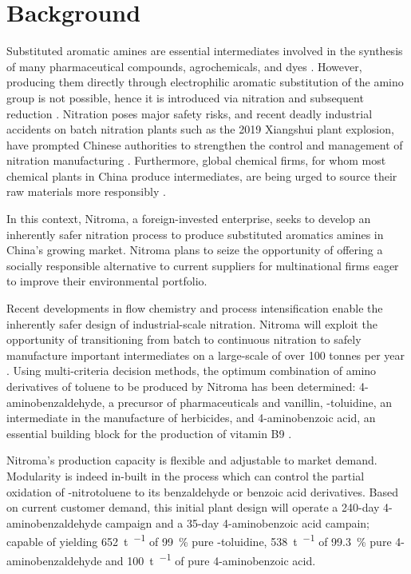 \section*{Background}

Substituted aromatic amines are essential intermediates involved in the synthesis of many pharmaceutical compounds, agrochemicals, and dyes \cite{vogt_amines_2000}. However, producing them directly through electrophilic aromatic substitution of the amino group is not possible, hence it is introduced via nitration and subsequent reduction \cite{dugal_nitrobenzene_2005}. Nitration poses major safety risks, and recent deadly industrial accidents on batch nitration plants such as the 2019 Xiangshui plant explosion, have prompted Chinese authorities to strengthen the control and management of nitration manufacturing \cite{el_diario_china_2019}. Furthermore, global chemical firms, for whom most chemical plants in China produce intermediates, are being urged to source their raw materials more responsibly \cite{stanway_global_2019}.

In this context, Nitroma, a foreign-invested enterprise, seeks to develop an inherently safer nitration process to produce substituted aromatics amines in China's growing market. Nitroma plans to seize the opportunity of offering a socially responsible alternative to current suppliers for multinational firms eager to improve their environmental portfolio. 

Recent developments in flow chemistry and process intensification enable the inherently safer design of industrial-scale nitration. Nitroma will exploit the opportunity of transitioning from batch to continuous nitration to safely manufacture important intermediates on a large-scale of over 100 tonnes per year \cite{di_miceli_raimondi_safety_2015}. Using multi-criteria decision methods, the optimum combination of amino derivatives of toluene to be produced by Nitroma has been determined: 4-aminobenzaldehyde, a precursor of pharmaceuticals and vanillin, \ortho-toluidine, an intermediate in the manufacture of herbicides, and 4-aminobenzoic acid, an essential building block for the production of vitamin B9 \cite{bowers_toluidines_2000,bruhne_benzaldehyde_2011,maki_benzoic_2000}.

Nitroma's production capacity is flexible and adjustable to market demand. Modularity is indeed in-built in the process which can control the partial oxidation of \para-nitrotoluene to its benzaldehyde or benzoic acid derivatives. Based on current customer demand, this initial plant design will operate a 240-day 4-aminobenzaldehyde campaign and a 35-day 4-aminobenzoic acid campain; capable of yielding \SI{652}{\tonne\per\year} of \SI{99}{\percent} pure \ortho-toluidine, \SI{538}{\tonne\per\year} of \SI{99.3}{\percent} pure 4-aminobenzaldehyde and \SI{100}{\tonne\per\year} of pure 4-aminobenzoic acid.

